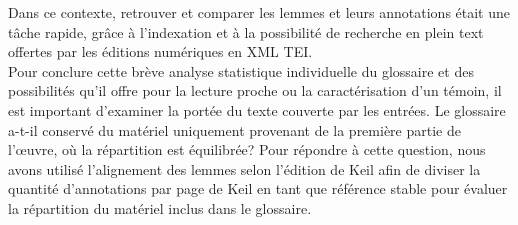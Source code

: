 \documentclass[a4paper, twoside, 12pt]{book}
\begin{document}
{\begin{table}[htbp]
\end{table}


Dans ce contexte, retrouver et comparer les lemmes et leurs annotations était une tâche rapide, grâce à l'indexation et à la possibilité de recherche en \og{} plein text \fg{} offertes par les éditions numériques en XML TEI. \\

Pour conclure cette brève analyse statistique individuelle du glossaire et des possibilités qu'il offre pour la lecture proche ou la caractérisation d'un témoin, il est important d'examiner la portée du texte couverte par les entrées. Le glossaire a-t-il conservé du matériel uniquement provenant de la première partie de l'œuvre, où la répartition est équilibrée? Pour répondre à cette question, nous avons utilisé l'alignement des lemmes selon l'édition de Keil afin de diviser la quantité d'annotations \og{}par page de Keil\fg{} en tant que référence stable pour évaluer la répartition du matériel inclus dans le glossaire. 

}
\end{document}

